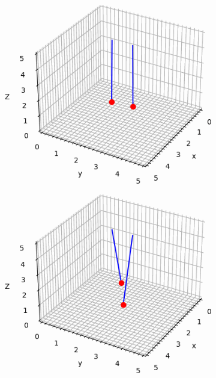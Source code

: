 \documentclass[12pt]{article}
\begin{document}
\begin{multicols}{2}
\begin{figure}[H]
\begin{subfigure}{0.32\linewidth}
    \end{subfigure}
    \begin{subfigure}{0.32\linewidth}
        \centering
        \includegraphics[width=0.98\linewidth]{figs/fig2/e_cropped.png}
        \caption{}
    \end{subfigure}
    \begin{subfigure}{0.32\linewidth}
        \centering
        \includegraphics[width=0.98\linewidth]{figs/fig2/f_cropped.png}
        \caption{}
    \end{subfigure}

\end{figure}
\end{multicols}
\end{document}
